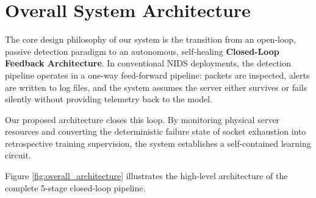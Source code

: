 \documentclass[12pt,a4paper,oneside]{report}
\begin{document}
\section{Overall System Architecture}
The core design philosophy of our system is the transition from an open-loop, passive detection paradigm to an autonomous, self-healing \textbf{Closed-Loop Feedback Architecture}. In conventional NIDS deployments, the detection pipeline operates in a one-way feed-forward pipeline: packets are inspected, alerts are written to log files, and the system assumes the server either survives or fails silently without providing telemetry back to the model.

Our proposed architecture closes this loop. By monitoring physical server resources and converting the deterministic failure state of socket exhaustion into retrospective training supervision, the system establishes a self-contained learning circuit.

Figure \ref{fig:overall_architecture} illustrates the high-level architecture of the complete 5-stage closed-loop pipeline.
\end{document}
